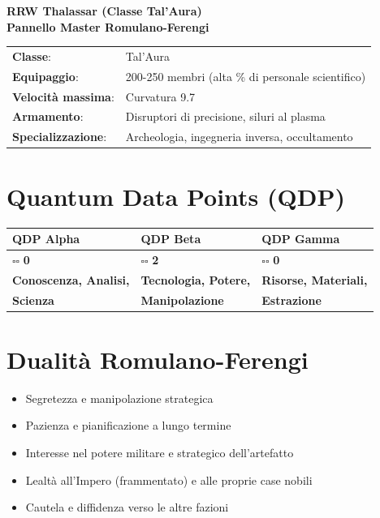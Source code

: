 \documentclass[11pt,a4paper]{article}
\begin{document}
\begin{center}
\Huge\textbf{\textcolor{romgreen}{RRW Thalassar (Classe Tal'Aura)}}\\[0.5cm]
\Large\textbf{Pannello Master Romulano-Ferengi}
\end{center}
\begin{tcolorbox}[colback=romlightgreen!20, colframe=romgreen, title=\textbf{Informazioni sulla Nave}]
\begin{tabular}{ll}
\textbf{Classe}: & Tal'Aura \\
\textbf{Equipaggio}: & 200-250 membri (alta \% di personale scientifico) \\
\textbf{Velocità massima}: & Curvatura 9.7 \\
\textbf{Armamento}: & Disruptori di precisione, siluri al plasma \\
\textbf{Specializzazione}: & Archeologia, ingegneria inversa, occultamento \\
\end{tabular}
\end{tcolorbox}

\section{Quantum Data Points (QDP)}

\begin{tcolorbox}[colback=romlightgreen!10, colframe=romgreen]
\begin{tabularx}{\textwidth}{|X|X|X|}
\hline
\rowcolor{romgreen!20} \textbf{QDP Alpha} & \textbf{QDP Beta} & \textbf{QDP Gamma} \\
\hline
\large $\square\square$ \textbf{0} & \large $\square\square$ \textbf{2} & \large $\square\square$ \textbf{0} \\
\hline
\textbf{Conoscenza, Analisi,} & \textbf{Tecnologia, Potere,} & \textbf{Risorse, Materiali,} \\
\textbf{Scienza} & \textbf{Manipolazione} & \textbf{Estrazione} \\
\hline
\end{tabularx}
\end{tcolorbox}

\section{Dualità Romulano-Ferengi}

\begin{tcolorbox}[colback=romgreen!10, colframe=romgreen, title=\textbf{Approccio Romulano}]
\begin{itemize}[leftmargin=*]
\item Segretezza e manipolazione strategica
\item Pazienza e pianificazione a lungo termine
\item Interesse nel potere militare e strategico dell'artefatto
\item Lealtà all'Impero (frammentato) e alle proprie case nobili
\item Cautela e diffidenza verso le altre fazioni
\end{itemize}
\end{tcolorbox}
\end{document}
